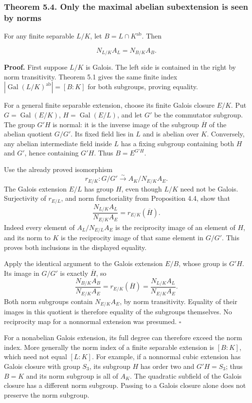 \documentclass[11pt,a4paper]{article}
\begin{document}
\subsubsection{Theorem 5.4. Only the maximal abelian subextension is
seen by
norms}\label{theorem-5.4.-only-the-maximal-abelian-subextension-is-seen-by-norms}

For any finite separable \(L/K\), let \(B=L\cap K^{\mathrm{ab}}\). Then

\[
N_{L/K}A_L=N_{B/K}A_B.
\tag{13}
\]

\textbf{Proof.} First suppose \(L/K\) is Galois. The left side is
contained in the right by norm transitivity. Theorem 5.1 gives the same
finite index \(|\operatorname{Gal}(L/K)^{\mathrm{ab}}|=[B:K]\) for both
subgroups, proving equality.

For a general finite separable extension, choose its finite Galois
closure \(E/K\). Put \(G=\operatorname{Gal}(E/K)\),
\(H=\operatorname{Gal}(E/L)\), and let \(G'\) be the commutator
subgroup. The group \(G'H\) is normal: it is the inverse image of the
subgroup \(\overline H\) of the abelian quotient \(G/G'\). Its fixed
field lies in \(L\) and is abelian over \(K\). Conversely, any abelian
intermediate field inside \(L\) has a fixing subgroup containing both
\(H\) and \(G'\), hence containing \(G'H\). Thus \(B=E^{G'H}\).

Use the already proved isomorphism \[
r_{E/K}:G/G'\xrightarrow{\sim}
A_K/N_{E/K}A_E.
\] The Galois extension \(E/L\) has group \(H\), even though \(L/K\)
need not be Galois. Surjectivity of \(r_{E/L}\), and norm functoriality
from Proposition 4.4, show that \[
\frac{N_{L/K}A_L}{N_{E/K}A_E}
=r_{E/K}(\overline H).
\] Indeed every element of \(A_L/N_{E/L}A_E\) is the reciprocity image
of an element of \(H\), and its norm to \(K\) is the reciprocity image
of that same element in \(G/G'\). This proves both inclusions in the
displayed equality.

Apply the identical argument to the Galois extension \(E/B\), whose
group is \(G'H\). Its image in \(G/G'\) is exactly \(\overline H\), so
\[
\frac{N_{B/K}A_B}{N_{E/K}A_E}
=r_{E/K}(\overline H)
=\frac{N_{L/K}A_L}{N_{E/K}A_E}.
\] Both norm subgroups contain \(N_{E/K}A_E\), by norm transitivity.
Equality of their images in this quotient is therefore equality of the
subgroups themselves. No reciprocity map for a nonnormal extension was
presumed. \(\square\)

For a nonabelian Galois extension, its full degree can therefore exceed
the norm index. More generally the norm index of a finite separable
extension is \([B:K]\), which need not equal \([L:K]\). For example, if
a nonnormal cubic extension has Galois closure with group \(S_3\), its
subgroup \(H\) has order two and \(G'H=S_3\); thus \(B=K\) and its norm
subgroup is all of \(A_K\). The quadratic subfield of the Galois closure
has a different norm subgroup. Passing to a Galois closure alone does
not preserve the norm subgroup.
\end{document}

